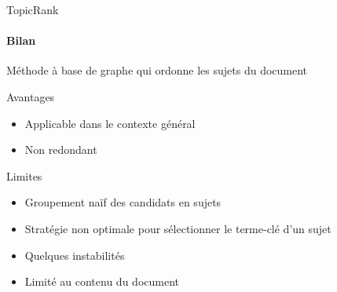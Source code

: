 %
%

\begin{frame}{TopicRank}\framesubtitle{Bilan}
  Méthode à base de graphe qui ordonne les sujets du document

  \vspace{1em}

  \begin{block}{Avantages}
    \begin{itemize}
      \item{Applicable dans le contexte général}
      \item{Non redondant}
    \end{itemize}
  \end{block}

  \vspace{1em}

  \begin{alertblock}{Limites}
    \begin{itemize}
      \item{Groupement naïf des candidats en sujets}
      \item{Stratégie non optimale pour sélectionner le terme-clé d'un sujet}
      \item{Quelques instabilités}
      \item{Limité au contenu du document}
    \end{itemize}
  \end{alertblock}
\end{frame}


